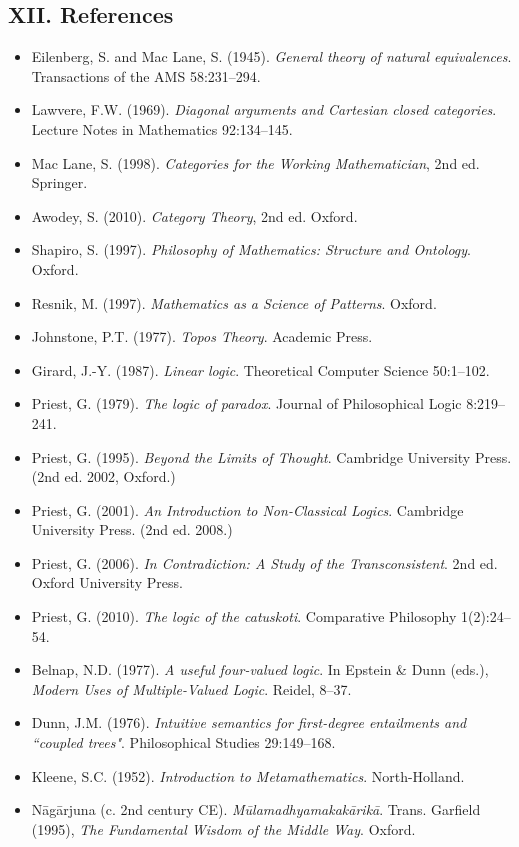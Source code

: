\documentclass[12pt,a4paper]{article}
\begin{document}
\subsection{XII. References}
\begin{itemize}
\item Eilenberg, S. and Mac Lane, S. (1945). \emph{General theory of natural equivalences}. Transactions of the AMS 58:231--294.
\item Lawvere, F.W. (1969). \emph{Diagonal arguments and Cartesian closed categories}. Lecture Notes in Mathematics 92:134--145.
\item Mac Lane, S. (1998). \emph{Categories for the Working Mathematician}, 2nd ed. Springer.
\item Awodey, S. (2010). \emph{Category Theory}, 2nd ed. Oxford.
\item Shapiro, S. (1997). \emph{Philosophy of Mathematics: Structure and Ontology}. Oxford.
\item Resnik, M. (1997). \emph{Mathematics as a Science of Patterns}. Oxford.
\item Johnstone, P.T. (1977). \emph{Topos Theory}. Academic Press.
\item Girard, J.-Y. (1987). \emph{Linear logic}. Theoretical Computer Science 50:1--102.
\item Priest, G. (1979). \emph{The logic of paradox}. Journal of Philosophical Logic 8:219--241.
\item Priest, G. (1995). \emph{Beyond the Limits of Thought}. Cambridge University Press. (2nd ed. 2002, Oxford.)
\item Priest, G. (2001). \emph{An Introduction to Non-Classical Logics}. Cambridge University Press. (2nd ed. 2008.)
\item Priest, G. (2006). \emph{In Contradiction: A Study of the Transconsistent}. 2nd ed. Oxford University Press.
\item Priest, G. (2010). \emph{The logic of the catuskoti}. Comparative Philosophy 1(2):24--54.
\item Belnap, N.D. (1977). \emph{A useful four-valued logic}. In Epstein \& Dunn (eds.), \emph{Modern Uses of Multiple-Valued Logic}. Reidel, 8--37.
\item Dunn, J.M. (1976). \emph{Intuitive semantics for first-degree entailments and ``coupled trees"}. Philosophical Studies 29:149--168.
\item Kleene, S.C. (1952). \emph{Introduction to Metamathematics}. North-Holland.
\item N\={a}g\={a}rjuna (c. 2nd century CE). \emph{M\={u}lamadhyamakak\={a}rik\={a}}. Trans. Garfield (1995), \emph{The Fundamental Wisdom of the Middle Way}. Oxford.

\end{itemize}
\end{document}
